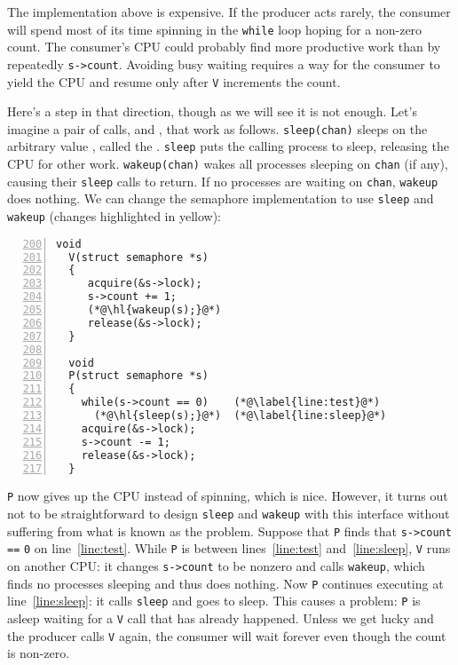 The implementation above 
is expensive.  If the producer acts
rarely, the consumer will spend most
of its time spinning in the 
\lstinline{while}
loop hoping for a non-zero count.
The consumer's CPU could probably find more productive work than 
by repeatedly 
\lstinline{s->count}.
Avoiding busy waiting requires
a way for the consumer to yield the CPU
and resume only after
\lstinline{V}
increments the count.

Here's a step in that direction, though as we
will see it is not enough.
Let's imagine a pair of calls, 
and
,
that work as follows.
\lstinline{sleep(chan)}
sleeps on the arbitrary value
,
called the 
.
\lstinline{sleep}
puts the calling process to sleep, releasing the CPU
for other work.
\lstinline{wakeup(chan)}
wakes all processes sleeping on
\lstinline{chan}
(if any), causing their
\lstinline{sleep}
calls to return.
If no processes are waiting on
\lstinline{chan},
\lstinline{wakeup}
does nothing.
We can change the semaphore implementation to use
\lstinline{sleep}
and
\lstinline{wakeup} (changes highlighted in yellow):
\begin{lstlisting}[numbers=left,firstnumber=200]
  void
  V(struct semaphore *s)
  {
     acquire(&s->lock);
     s->count += 1;
     (*@\hl{wakeup(s);}@*)
     release(&s->lock);
  }
  
  void
  P(struct semaphore *s)
  {
    while(s->count == 0)    (*@\label{line:test}@*)
      (*@\hl{sleep(s);}@*)  (*@\label{line:sleep}@*)
    acquire(&s->lock);
    s->count -= 1;
    release(&s->lock);
  }
\end{lstlisting}


\lstinline{P}
now gives up the CPU instead of spinning, which is nice.
However, it turns out not to be straightforward to design
\lstinline{sleep}
and 
\lstinline{wakeup}
with this interface without suffering
from what is known as the  problem.
Suppose that
\lstinline{P}
finds that
\lstinline{s->count}
\lstinline{==}
\lstinline{0} 
on line~\ref{line:test}.
While
\lstinline{P}
is between lines~\ref{line:test} and~\ref{line:sleep},
\lstinline{V}
runs on another CPU:
it changes
\lstinline{s->count}
to be nonzero and calls
\lstinline{wakeup},
which finds no processes sleeping and thus does nothing.
Now
\lstinline{P}
continues executing at line~\ref{line:sleep}:
it calls
\lstinline{sleep}
and goes to sleep.
This causes a problem:
\lstinline{P}
is asleep waiting for a \lstinline{V} call
that has already happened.
Unless we get lucky and the producer calls
\lstinline{V} again, the consumer will wait
forever even
though the count is non-zero.

